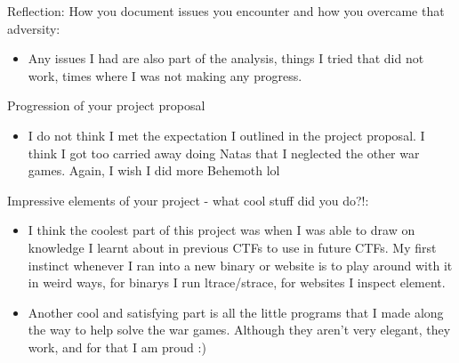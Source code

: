 \documentclass{article}
\begin{document}
Reflection: How you document issues you encounter and how you overcame that adversity:

\begin{itemize}
	\item Any issues I had are also part of the analysis, things I tried that did not work, times where I was not making any progress.
\end{itemize}

Progression of your project proposal

\begin{itemize}
	\item I do not think I met the expectation I outlined in the project proposal. I think I got too carried away doing Natas that I neglected the other war games. Again, I wish I did more Behemoth lol
\end{itemize}

Impressive elements of your project - what cool stuff did you do?!:

\begin{itemize}
	\item I think the coolest part of this project was when I was able to draw on knowledge I learnt about in previous CTFs to use in future CTFs. My first instinct whenever I ran into a new binary or website is to play around with it in weird ways, for binarys I run ltrace/strace, for websites I inspect element.
	\item Another cool and satisfying part is all the little programs that I made along the way to help solve the war games. Although they aren't very elegant, they work, and for that I am proud :)
\end{itemize}
\end{document}
